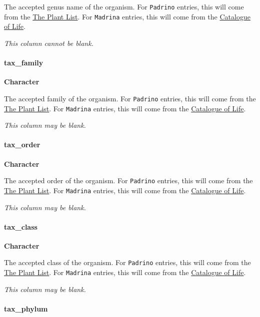 \documentclass[]{article}
\let\oldparagraph\paragraph
\renewcommand{\paragraph}[1]{\oldparagraph{#1}\mbox{}}
\begin{document}
The accepted genus name of the organism. For \texttt{Padrino} entries,
this will come from the \href{http://www.theplantlist.org/}{The Plant
List}. For \texttt{Madrina} entries, this will come from the
\href{http://www.catalogueoflife.org/}{Catalogue of Life}.

\emph{This column cannot be blank.}

\paragraph{tax\_family}\label{tax_family}

\textbf{Character}

The accepted family of the organism. For \texttt{Padrino} entries, this
will come from the \href{http://www.theplantlist.org/}{The Plant List}.
For \texttt{Madrina} entries, this will come from the
\href{http://www.catalogueoflife.org/}{Catalogue of Life}.

\emph{This column may be blank.}

\paragraph{tax\_order}\label{tax_order}

\textbf{Character}

The accepted order of the organism. For \texttt{Padrino} entries, this
will come from the \href{http://www.theplantlist.org/}{The Plant List}.
For \texttt{Madrina} entries, this will come from the
\href{http://www.catalogueoflife.org/}{Catalogue of Life}.

\emph{This column may be blank.}

\paragraph{tax\_class}\label{tax_class}

\textbf{Character}

The accepted class of the organism. For \texttt{Padrino} entries, this
will come from the \href{http://www.theplantlist.org/}{The Plant List}.
For \texttt{Madrina} entries, this will come from the
\href{http://www.catalogueoflife.org/}{Catalogue of Life}.

\emph{This column may be blank.}

\paragraph{tax\_phylum}\label{tax_phylum}
\end{document}
